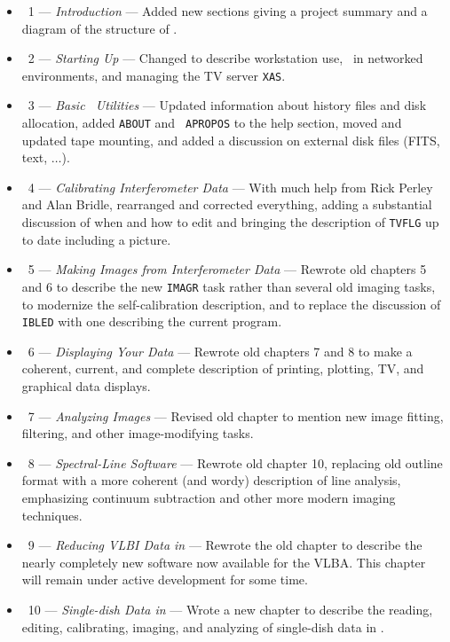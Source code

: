 \begin{itemize}
\item\ 1 --- {\it Introduction} --- Added new sections giving a
   project summary and a diagram of the structure of \hbox{\AIPS}.
\item\ 2 --- {\it Starting Up \AIPS} ---  Changed to describe
   workstation use, \AIPS\ in networked environments, and managing the
   TV server \hbox{{\tt XAS}}.
\item\ 3 --- {\it Basic \AIPS\ Utilities} --- Updated information about
   history files and disk allocation, added {\tt ABOUT} and {\tt
   APROPOS} to the help section, moved and updated tape mounting, and
   added a discussion on external disk files (FITS, text, $\ldots$).
\item\ 4 --- {\it Calibrating Interferometer Data} --- With much help
   from Rick Perley and Alan Bridle, rearranged and corrected
   everything, adding a substantial discussion of when and how to edit
   and bringing the description of {\tt TVFLG} up to date including a
   picture.
\item\ 5 --- {\it Making Images from Interferometer Data} --- Rewrote
   old chapters 5 and 6 to describe the new {\tt IMAGR} task rather
   than several old imaging tasks, to modernize the self-calibration
   description, and to replace the discussion of {\tt    IBLED} with
   one describing the current program.
\item\ 6 --- {\it Displaying Your Data} --- Rewrote old chapters 7
   and 8 to make a coherent, current, and complete description of
   printing, plotting, TV, and graphical data displays.
\item\ 7 --- {\it Analyzing Images} --- Revised old chapter to mention
   new image fitting, filtering, and other image-modifying tasks.
\item\ 8 --- {\it Spectral-Line Software} --- Rewrote old chapter 10,
   replacing old outline format with a more coherent (and wordy)
   description of line analysis, emphasizing continuum subtraction and
   other more modern imaging techniques.
\item\ 9 --- {\it Reducing VLBI Data in \AIPS} --- Rewrote the old
   chapter to describe the nearly completely new software now
   available for the \hbox{VLBA}.  This chapter will remain under
   active development for some time.
\item\ 10 --- {\it Single-dish Data in \AIPS} --- Wrote a new chapter
   to describe the reading, editing, calibrating, imaging, and
   analyzing of single-dish data in \hbox{\AIPS}.

\end{itemize}
